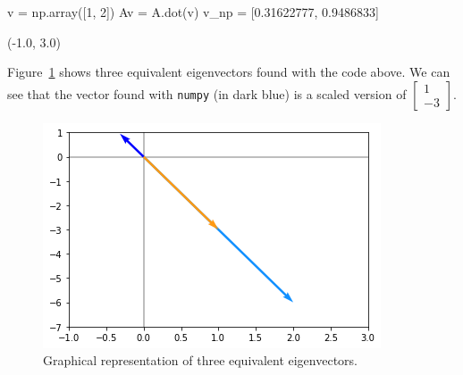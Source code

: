 \begin{ipython}
v = np.array([1, 2])
Av = A.dot(v)
v_np = [0.31622777, 0.9486833]	
\end{ipython}
\begin{ioutput}
(-1.0, 3.0)
\end{ioutput}
Figure~\ref{fig:eigenvectors} shows three equivalent eigenvectors found
with the code above. We can see that the vector found with \texttt{numpy} (in dark blue) is a scaled version of $\begin{bmatrix}1\\ -3\end{bmatrix}$.

\begin{figure}[htb]
	\centering
	\includegraphics[width=0.7\linewidth]{figures/eigenvectors}
	\caption{Graphical representation of three equivalent eigenvectors.}
	\label{fig:eigenvectors}
\end{figure}

